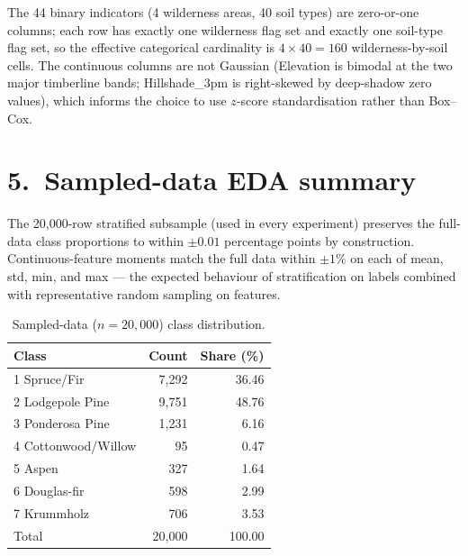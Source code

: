\documentclass[11pt]{article}
\begin{document}
The 44 binary indicators (4 wilderness areas, 40 soil types) are
zero-or-one columns; each row has exactly one wilderness flag set and
exactly one soil-type flag set, so the effective categorical cardinality
is $4 \times 40 = 160$ wilderness-by-soil cells. The continuous columns
are not Gaussian (Elevation is bimodal at the two major timberline bands;
Hillshade\_3pm is right-skewed by deep-shadow zero values), which informs
the choice to use $z$-score standardisation rather than Box--Cox.

\section*{5.\ Sampled-data EDA summary}
The 20{,}000-row stratified subsample (used in every experiment) preserves
the full-data class proportions to within $\pm 0.01$ percentage points by
construction. Continuous-feature moments match the full data within $\pm
1\%$ on each of mean, std, min, and max --- the expected behaviour of
stratification on labels combined with representative random sampling on
features.

\begin{table}[h]\centering
\caption{Sampled-data ($n{=}20{,}000$) class distribution.}
\begin{tabularx}{0.85\linewidth}{Xrr}
\toprule
\textcolor{denimdark}{\textbf{Class}} & \textbf{Count} & \textbf{Share (\%)} \\
\midrule
1 Spruce/Fir          & 7{,}292 & 36.46 \\
2 Lodgepole Pine      & 9{,}751 & 48.76 \\
3 Ponderosa Pine      & 1{,}231 &  6.16 \\
4 Cottonwood/Willow   &      95 &  0.47 \\
5 Aspen               &     327 &  1.64 \\
6 Douglas-fir         &     598 &  2.99 \\
7 Krummholz           &     706 &  3.53 \\
\midrule
Total                 & 20{,}000 & 100.00 \\
\bottomrule
\end{tabularx}
\end{table}
\end{document}
